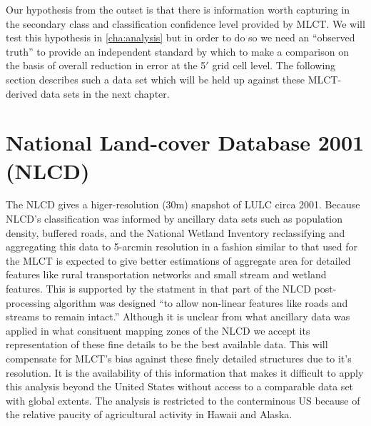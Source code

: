 Our hypothesis from the outset is that there is information worth
capturing in the secondary class and classification confidence level
provided by MLCT.  We will test this hypothesis in
\autoref{cha:analysis} but in order to do so we need an ``observed
truth'' to provide an independent standard by which to make a
comparison on the basis of overall reduction in error at the 5$'$ grid
cell level.  The following section describes such a data set which
will be held up against these MLCT-derived data sets in the next
chapter.





\section{National Land-cover Database 2001 (NLCD)}
\label{sec:nlcd}


The NLCD gives a higer-resolution (30m) snapshot of LULC circa 2001.
Because NLCD's classification was informed by ancillary data sets such
as population density, buffered roads, and the National Wetland
Inventory \citep{Homer2004} reclassifying and aggregating this data to
5-arcmin resolution in a fashion similar to that used for the MLCT is
expected to give better estimations of aggregate area for detailed
features like rural transportation networks and small stream and
wetland features.  This is supported by the statment in
\citet{Homer2007} that part of the NLCD post-processing algorithm was
designed ``to allow non-linear features like roads and streams to
remain intact.''  Although it is unclear from \citet{Homer2004} what
ancillary data was applied in what consituent mapping zones of the
NLCD we accept its representation of these fine details to be the best
available data.  This will compensate for MLCT's bias against these
finely detailed structures due to it's resolution.  It is the
availability of this information that makes it difficult to apply this
analysis beyond the United States without access to a comparable data
set with global extents.  The analysis is restricted to the
conterminous US because of the relative paucity of agricultural
activity in Hawaii and Alaska.

